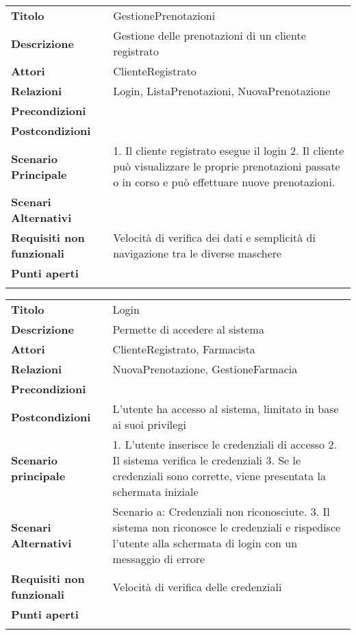 \begin{longtable}[c]{@{}ll@{}}
\toprule\addlinespace
\textbf{Titolo} & GestionePrenotazioni
\\\addlinespace
\textbf{Descrizione} & Gestione delle prenotazioni di un cliente
registrato
\\\addlinespace
\textbf{Attori} & ClienteRegistrato
\\\addlinespace
\textbf{Relazioni} & Login, ListaPrenotazioni, NuovaPrenotazione
\\\addlinespace
\textbf{Precondizioni} &
\\\addlinespace
\textbf{Postcondizioni} &
\\\addlinespace
\textbf{Scenario Principale} & 1. Il cliente registrato esegue il login
2. Il cliente può visualizzare le proprie prenotazioni passate o in
corso e può effettuare nuove prenotazioni.
\\\addlinespace
\textbf{Scenari Alternativi} &
\\\addlinespace
\textbf{Requisiti non funzionali} & Velocità di verifica dei dati e
semplicità di navigazione tra le diverse maschere
\\\addlinespace
\textbf{Punti aperti} &
\\\addlinespace
\bottomrule
\end{longtable}

\begin{longtable}[c]{@{}ll@{}}
\toprule\addlinespace
\textbf{Titolo} & Login
\\\addlinespace
\textbf{Descrizione} & Permette di accedere al sistema
\\\addlinespace
\textbf{Attori} & ClienteRegistrato, Farmacista
\\\addlinespace
\textbf{Relazioni} & NuovaPrenotazione, GestioneFarmacia
\\\addlinespace
\textbf{Precondizioni} &
\\\addlinespace
\textbf{Postcondizioni} & L'utente ha accesso al sistema, limitato in
base ai suoi privilegi
\\\addlinespace
\textbf{Scenario principale} & 1. L'utente inserisce le credenziali di
accesso 2. Il sistema verifica le credenziali 3. Se le credenziali sono
corrette, viene presentata la schermata iniziale
\\\addlinespace
\textbf{Scenari Alternativi} & Scenario a: Credenziali non riconosciute.
3. Il sistema non riconosce le credenziali e rispedisce l'utente alla
schermata di login con un messaggio di errore
\\\addlinespace
\textbf{Requisiti non funzionali} & Velocità di verifica delle
credenziali
\\\addlinespace
\textbf{Punti aperti} &
\\\addlinespace
\bottomrule
\end{longtable}

